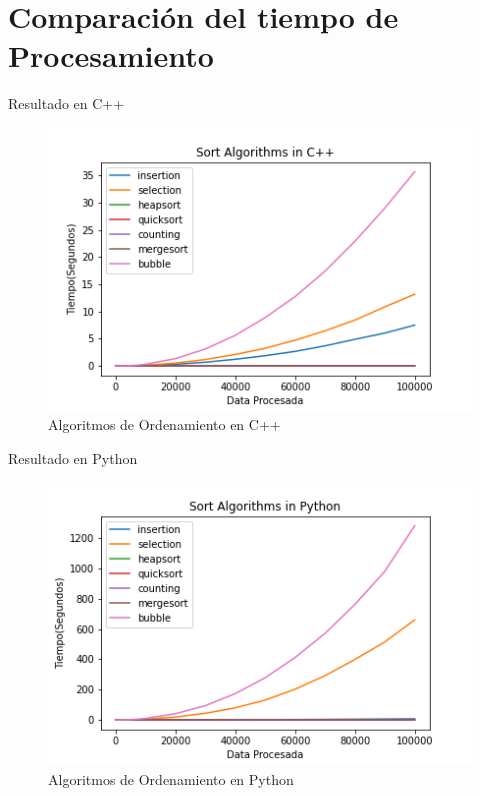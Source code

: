 \documentclass[11pt]{beamer}
\begin{document}
	\section{Comparación del tiempo de Procesamiento}
		\begin{frame}{Resultado en C++}
			\justifying
			\begin{figure}[H]
        				\centering
        				\includegraphics[scale=0.5]{img/sort-algorithms-cpp.png}
        				\caption{Algoritmos de Ordenamiento en C++}
        				\label{fig:sort-algorithms-cpp}
        			\end{figure}
		\end{frame}
		\begin{frame}{Resultado en Python}
			\justifying
			\begin{figure}[H]
        				\centering
        				\includegraphics[scale=0.5]{img/sort-algorithms-python.png}
        				\caption{Algoritmos de Ordenamiento en Python}
        				\label{fig:sort-algorithms-python}
        			\end{figure}
		\end{frame}
\end{document}
